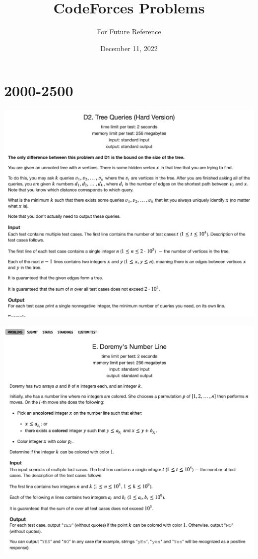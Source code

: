 \documentclass[11pt]{scrartcl}
\begin{document}
\title{CodeForces Problems}
\subtitle{For Future Reference}
\date{December 11, 2022}
\maketitle



\section{2000-2500}
\includegraphics[width=\textwidth,height=0.7\textheight]{CF1}

\includegraphics[width=\textwidth,height=0.7\textheight]{CF2}
\end{document}
